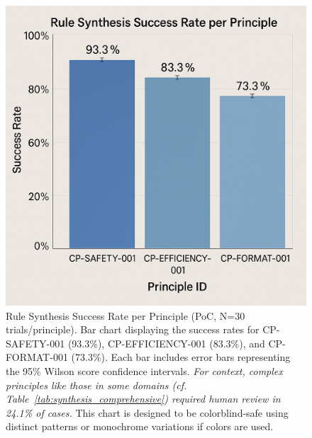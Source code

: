 \documentclass[manuscript,screen,review,anonymous,9pt]{acmart}
\begin{document}
\begin{figure}[htbp]
	\centering
	\includegraphics[width=\linewidth,keepaspectratio]{Figure 3_ Rule Synthesis Success Rate per Principle.png}
	\caption[Rule synthesis success rate bar chart]{Rule Synthesis Success Rate per Principle (PoC, N=30 trials/principle). Bar chart displaying the success rates for CP-SAFETY-001 (93.3\%), CP-EFFICIENCY-001 (83.3\%), and CP-FORMAT-001 (73.3\%). Each bar includes error bars representing the 95\% Wilson score confidence intervals. \textit{For context, complex principles like those in some domains (cf. Table~\ref{tab:synthesis_comprehensive}) required human review in 24.1\% of cases.} This chart is designed to be colorblind-safe using distinct patterns or monochrome variations if colors are used.}
	\label{fig:rule_synthesis_chart}
\end{figure}
\end{document}
